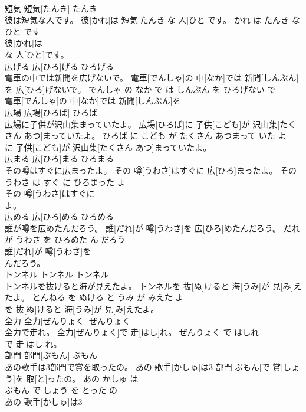 \documentclass[8pt]{extreport}
\begin{document}
\begin{CJK}{UTF8}{min}
\\	短気	短気[たんき]	たんき	
\\	彼は短気な人です。	彼[かれ]は 短気[たんき]な 人[ひと]です。	かれ は たんき な ひと です	
\\	彼[かれ]は
\\	な 人[ひと]です。			
\\	広げる	広[ひろ]げる	ひろげる	
\\	電車の中では新聞を広げないで。	電車[でんしゃ]の 中[なか]では 新聞[しんぶん]を 広[ひろ]げないで。	でんしゃ の なか で は しんぶん を ひろげない で	
\\	電車[でんしゃ]の 中[なか]では 新聞[しんぶん]を
\\	広場	広場[ひろば]	ひろば	
\\	広場に子供が沢山集まっていたよ。	広場[ひろば]に 子供[こども]が 沢山集[たくさん あつ]まっていたよ。	ひろば に こども が たくさん あつまって いた よ	
\\	に 子供[こども]が 沢山集[たくさん あつ]まっていたよ。			
\\	広まる	広[ひろ]まる	ひろまる	
\\	その噂はすぐに広まったよ。	その 噂[うわさ]はすぐに 広[ひろ]まったよ。	その うわさ は すぐ に ひろまった よ	
\\	その 噂[うわさ]はすぐに
\\	よ。			
\\	広める	広[ひろ]める	ひろめる	
\\	誰が噂を広めたんだろう。	誰[だれ]が 噂[うわさ]を 広[ひろ]めたんだろう。	だれ が うわさ を ひろめた ん だろう	
\\	誰[だれ]が 噂[うわさ]を
\\	んだろう。			
\\	トンネル	トンネル	トンネル	
\\	トンネルを抜けると海が見えたよ。	トンネルを 抜[ぬ]けると 海[うみ]が 見[み]えたよ。	とんねる を ぬける と うみ が みえた よ	
\\	を 抜[ぬ]けると 海[うみ]が 見[み]えたよ。			
\\	全力	全力[ぜんりょく]	ぜんりょく	
\\	全力で走れ。	全力[ぜんりょく]で 走[はし]れ。	ぜんりょく で はしれ	
\\	で 走[はし]れ。			
\\	部門	部門[ぶもん]	ぶもん	
\\	あの歌手は3部門で賞を取ったの。	あの 歌手[かしゅ]は3 部門[ぶもん]で 賞[しょう]を 取[と]ったの。	あの かしゅ は 
\\	ぶもん で しょう を とった の	
\\	あの 歌手[かしゅ]は3

\end{CJK}
\end{document}
